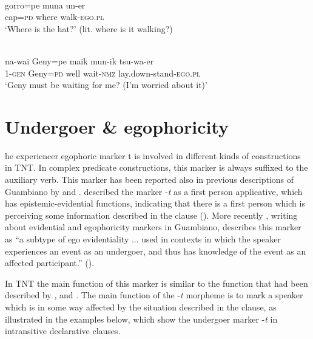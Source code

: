 \documentclass[output=paper]{langsci/langscibook}
\begin{document}
\ea \label{ex:gg63}
\\
	\gll gorro=pe	muna	un-er\\
	cap=\textsc{pd}	where	walk-\textsc{ego.pl}\\
	‘Where is the hat?’ (lit. where is it walking?)
\z 

\ea \label{ex:gg64}
\\
	\gll na-wai	Geny=pe	maik mun-ik	tsu-wa-er\\
	1-\textsc{gen}	Geny=\textsc{pd}	well	wait-\textsc{nmz}	lay.down-stand-\textsc{ego.pl}\\
	\glt ‘Geny must be waiting for me? (I’m worried about it)’
\z 


\section{Undergoer \& egophoricity}\label{s:gg5}

he experiencer egophoric marker t is involved in different kinds of constructions in TNT. In complex predicate constructions, this marker is always suffixed to the auxiliary verb. This marker has been reported also in previous descriptions of Guambiano by \citet[101]{Vasquez2007} and \citet[615]{TrivinoGarzon1994}. %
\citet{Vasquez2007} described the marker -\textit{t} as a first person applicative, which has epistemic-evidential functions, indicating that there is a first person which is perceiving some information described in the clause (\citealt[101]{Vasquez2007}). %
More recently \citet{Norcliffe2018}, writing about evidential and egophoricity markers in Guambiano, describes this marker as “a subtype of ego evidentiality ... used in contexts in which the speaker experiences an event as an undergoer, and thus has knowledge of the event as an affected participant.” (\citealt[25]{Norcliffe2018}).

In TNT the main function of this marker is similar to the function that had been described by \citet{Vasquez2007}, \citet{TrivinoGarzon1994} and \citet{Norcliffe2018}. The main function of the -\textit{t} morpheme is to mark a speaker which is in some way affected by the situation described in the clause, as illustrated in the examples below, which show the undergoer marker -\textit{t}  in intransitive declarative clauses. 
\end{document}
